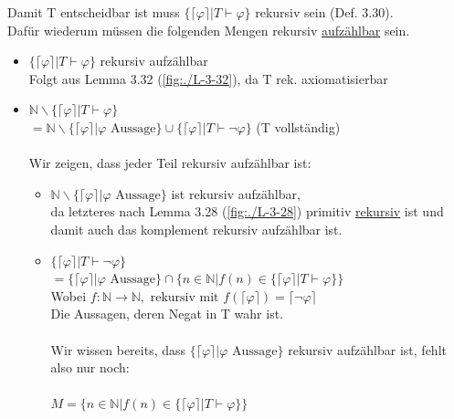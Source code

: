 \documentclass[a4paper]{scrartcl}%
\begin{document}
    Damit T entscheidbar ist muss $\{\lceil \varphi \rceil | T \vdash \varphi \}$ rekursiv sein (Def. 3.30).\\
    Dafür wiederum müssen die folgenden Mengen rekursiv \underline{aufzählbar} sein.\\
    \begin{itemize}
        \item $\{\lceil \varphi \rceil | T \vdash \varphi \}$ rekursiv aufzählbar\\
            Folgt aus Lemma 3.32 (\ref{fig:./L-3-32}), da T rek. axiomatisierbar\\
        \item $\mathds{N} \backslash \{\lceil \varphi \rceil | T \vdash \varphi \}$\\
            $= \mathds{N} \backslash \{\lceil \varphi \rceil | \varphi \text{ Aussage}\} \cup \{\lceil \varphi \rceil | T \vdash \neg \varphi\}$ (T vollständig)\\
            \\Wir zeigen, dass jeder Teil rekursiv aufzählbar ist:\\
            \begin{itemize}
                \item $ \mathds{N} \backslash \{\lceil \varphi \rceil | \varphi \text{ Aussage}\}$ ist rekursiv aufzählbar,\\
                    da letzteres nach Lemma 3.28 (\ref{fig:./L-3-28}) primitiv \underline{rekursiv} ist und damit auch das komplement rekursiv aufzählbar ist.\\
                \item $\{\lceil \varphi \rceil | T \vdash \neg \varphi\}$\\
                    $= \{\lceil \varphi \rceil | \varphi \text{ Aussage}\} \cap \{n \in \mathds{N} | f(n) \in \{\lceil \varphi \rceil | T \vdash \varphi\}\}$\\
                    Wobei $f: \mathds{N} \rightarrow \mathds{N}, \text{ rekursiv mit } f(\lceil \varphi \rceil) = \lceil \neg \varphi \rceil$\\
                    Die Aussagen, deren Negat in T wahr ist.\\
                    \\Wir wissen bereits, dass $\{\lceil \varphi \rceil | \varphi \text{ Aussage}\}$ rekursiv aufzählbar ist, fehlt also nur noch:\\
                    \\$M = \{n \in \mathds{N} | f(n) \in \{\lceil \varphi \rceil | T \vdash \varphi\}\}$\\

\end{itemize}
\end{itemize}
\end{document}
